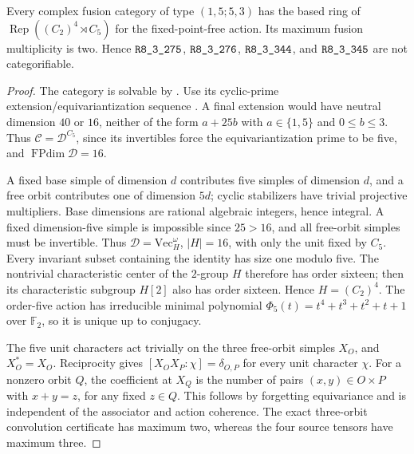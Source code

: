 \begin{theorem}\label{thm:m3-dimension80}
Every complex fusion category of type $(1,5;5,3)$ has the based ring of
$\operatorname{Rep}((C_2)^4\rtimes C_5)$ for the fixed-point-free action.
Its maximum fusion multiplicity is two. Hence $\sha{R8_3_275}$,
$\sha{R8_3_276}$, $\sha{R8_3_344}$, and $\sha{R8_3_345}$ are not categorifiable.
\end{theorem}
\begin{proof}
The category is solvable by \cite[Theorem 1.6]{ENOSolvable}. Use its
cyclic-prime extension/equivariantization sequence
\cite[Definition 1.2(ii), Proposition 4.4]{ENOSolvable}. A final
extension would have neutral dimension $40$ or $16$, neither of the
form $a+25b$ with $a\in\{1,5\}$ and $0\le b\le3$.
Thus $\mathcal C=\mathcal D^{C_5}$, since its invertibles force the
equivariantization prime to be five, and $\operatorname{FPdim}\mathcal D=16$.

A fixed base simple of dimension $d$ contributes five simples of
dimension $d$, and a free orbit contributes one of dimension $5d$;
cyclic stabilizers have trivial projective multipliers. Base dimensions
are rational algebraic integers, hence integral. A fixed dimension-five
simple is impossible since $25>16$, and all free-orbit simples must be
invertible. Thus $\mathcal D=\mathrm{Vec}_H^\omega$, $|H|=16$, with
only the unit fixed by $C_5$.
Every invariant subset containing the identity has size one modulo five.
The nontrivial characteristic center of the $2$-group $H$ therefore has
order sixteen; then its characteristic subgroup $H[2]$ also has order
sixteen. Hence $H=(C_2)^4$. The order-five action has irreducible minimal
polynomial $\Phi_5(t)=t^4+t^3+t^2+t+1$ over $\mathbb F_2$, so it is
unique up to conjugacy.

The five unit characters act trivially on the three free-orbit simples
$X_O$, and $X_O^*=X_O$. Reciprocity gives
$[X_OX_P:\chi]=\delta_{O,P}$ for every unit character $\chi$.
For a nonzero orbit $Q$, the coefficient at $X_Q$ is the number of
pairs $(x,y)\in O\times P$ with $x+y=z$, for any fixed $z\in Q$.
This follows by forgetting equivariance and is independent of the
associator and action coherence. The exact three-orbit convolution
certificate has maximum two, whereas the four source tensors have
maximum three.
\end{proof}

